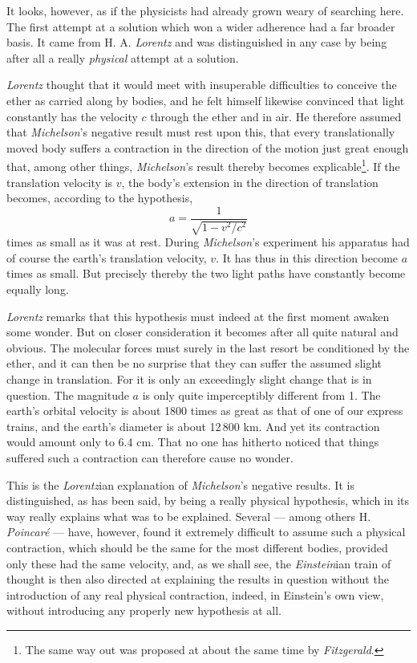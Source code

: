 \documentclass[12pt,a4paper]{article}
\begin{document}
It looks, however, as if the physicists had already grown weary of searching
here. The first attempt at a solution which won a wider
adherence had a far broader basis. It came from H. A. \emph{Lorentz} and was
distinguished in any case by being after all a really \emph{physical} attempt
at a solution.

\emph{Lorentz} thought that it would meet with insuperable difficulties to
conceive the ether as carried along by bodies, and he felt himself likewise
convinced that light constantly has the velocity $c$ through the ether and in
air. He therefore assumed that \emph{Michelson}'s negative result must rest
upon this, that every translationally moved body suffers a contraction in the
direction of the motion just great enough that, among other things,
\emph{Michelson}'s result thereby becomes explicable\footnote{The same way out
was proposed at about the same time by \emph{Fitzgerald}.}. If the translation
velocity is $v$, the body's extension in the direction of translation becomes,
according to the hypothesis,
\[
  a = \frac{1}{\sqrt{1-v^{2}/c^{2}}}
\]
times as small as it was at rest. During \emph{Michelson}'s experiment his
apparatus had of course the earth's translation velocity, $v$. It has thus in
this direction become $a$ times as small. But precisely thereby the two light
paths have constantly become equally long.

\emph{Lorentz} remarks that this hypothesis must indeed at the first moment
awaken some wonder. But on closer consideration it becomes after all quite
natural and obvious. The molecular forces must surely in the last resort be
conditioned by the ether, and it can then be no surprise that they can suffer
the assumed slight change in translation. For it is only an exceedingly slight
change that is in question. The magnitude $a$ is only quite imperceptibly
different from 1. The earth's orbital velocity is about 1800 times as great as
that of one of our express trains, and the earth's diameter is about
12\,800 km. And yet its contraction would amount only to 6.4 cm. That no one
has hitherto noticed that things suffered such a contraction can therefore
cause no wonder.

This is the \emph{Lorentz}ian explanation of \emph{Michelson}'s negative
results. It is distinguished, as has been said, by being a really physical
hypothesis, which in its way really explains what was to be explained.
Several --- among others H. \emph{Poincaré} --- have, however, found it
extremely difficult to assume such a physical contraction, which should be the
same for the most different bodies, provided only
these had the same velocity, and, as we shall see, the \emph{Einstein}ian
train of thought is then also directed at explaining the results in question
without the introduction of any real physical contraction, indeed, in
Einstein's own view, without introducing any properly new hypothesis at all.
\end{document}
